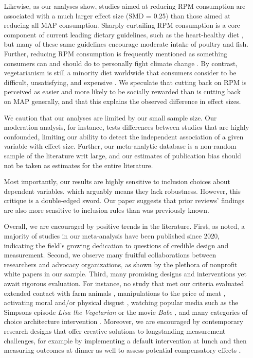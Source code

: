 \documentclass[sn-nature,referee,pdflatex]{sn-jnl}
\begin{document}
Likewise, as our analyses show, studies aimed at reducing RPM
consumption are associated with a much larger effect size (SMD = 0.25)
than those aimed at reducing all MAP consumption. Sharply curtailing RPM
consumption is a core component of current leading dietary guidelines,
such as the heart-healthy diet \citep{diab2023}, but many of these same
guidelines encourage moderate intake of poultry and fish. Further,
reducing RPM consumption is frequently mentioned as something consumers
can and should do to personally fight climate change
\citep{auclair2024}. By contrast, vegetarianism is still a minority diet
worldwide \citep{tilman2014} that consumers consider to be difficult,
unsatisfying, and expensive \citep{bryant2019}. We speculate that
cutting back on RPM is perceived as easier and more likely to be
socially rewarded than is cutting back on MAP generally, and that this
explains the observed difference in effect sizes.

We caution that our analyses are limited by our small sample size. Our
moderation analysis, for instance, tests differences between studies
that are highly confounded, limiting our ability to detect the
independent association of a given variable with effect size. Further,
our meta-analytic database is a non-random sample of the literature writ
large, and our estimates of publication bias should not be taken as
estimates for the entire literature.

Most importantly, our results are highly sensitive to inclusion choices
about dependent variables, which arguably means they lack robustness.
However, this critique is a double-edged sword. Our paper suggests that
prior reviews' findings are also more sensitive to inclusion rules than
was previously known.

Overall, we are encouraged by positive trends in the literature. First,
as noted, a majority of studies in our meta-analysis have been published
since 2020, indicating the field's growing dedication to questions of
credible design and measurement. Second, we observe many fruitful
collaborations between researchers and advocacy organizations, as shown
by the plethora of nonprofit white papers in our sample. Third, many
promising designs and interventions yet await rigorous evaluation. For
instance, no study that met our criteria evaluated extended contact with
farm animals \citep{cerrato2022}, manipulations to the price of meat
\citep{wilde2016}, activating moral and/or physical disgust
\citep{palomo2018}, watching popular media such as the Simpsons episode
\emph{Lisa the Vegetarian} \citep{byrd2010} or the movie \emph{Babe
\citep{novatna2019}}, and many categories of choice architecture
intervention \citep{olafsson2024}. Moreover, we are encouraged by
contemporary research designs that offer creative solutions to
longstanding measurement challenges, for example by implementing a
default intervention at lunch and then measuring outcomes at dinner as
well to assess potential compensatory effects \citep{vocski2024}.
\end{document}

